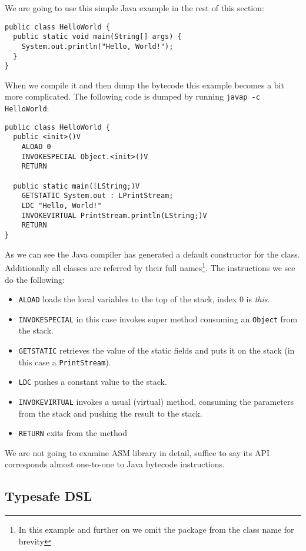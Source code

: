 \documentclass{sig-alternate}
\begin{document}
We are going to use this simple Java example in the rest of this section:

\begin{verbatim}
public class HelloWorld {
  public static void main(String[] args) {
    System.out.println("Hello, World!");
  }
}
\end{verbatim}

When we compile it and then dump the bytecode this example becomes a bit more complicated. The following code is dumped by running \verb!javap -c HelloWorld!:

\begin{verbatim}
public class HelloWorld {
  public <init>()V
    ALOAD 0
    INVOKESPECIAL Object.<init>()V
    RETURN
  
  public static main([LString;)V
    GETSTATIC System.out : LPrintStream;
    LDC "Hello, World!"
    INVOKEVIRTUAL PrintStream.println(LString;)V
    RETURN
}
\end{verbatim}

As we can see the Java compiler has generated a default constructor for the class. Additionally all classes are referred by their full names\footnote{In this example and further on we omit the package from the class name for brevity}. The instructions we see do the following:
\begin{itemize}
\item \verb!ALOAD! loads the local variables to the top of the stack, index $0$ is \emph{this}.
\item \verb!INVOKESPECIAL! in this case invokes super method consuming an \verb!Object! from the stack.
\item \verb!GETSTATIC! retrieves the value of the static fields and puts it on the stack (in this case a \verb!PrintStream!).
\item \verb!LDC! pushes a constant value to the stack.
\item \verb!INVOKEVIRTUAL! invokes a usual (virtual) method, consuming the parameters from the stack and pushing the result to the stack.
\item \verb!RETURN! exits from the method
\end{itemize}

We are not going to examine ASM library in detail, suffice to say its API corresponds almost one-to-one to Java bytecode instructions.

\subsection{Typesafe DSL}
\end{document}
